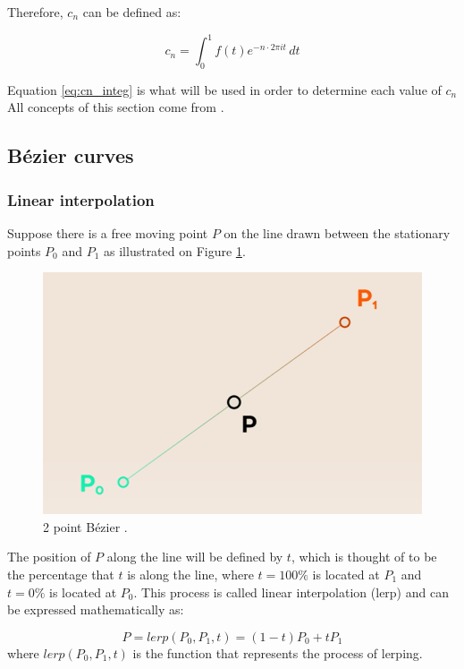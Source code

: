 \documentclass[letterpaper, 12pt]{article}
\begin{document}
Therefore, \(c_n\) can be defined as:

\begin{equation}
    c_n = \int_{0}^{1} f(t) e^{-n \cdot 2\pi it} \,dt
    \label{eq:cn_integ}
\end{equation}

Equation \ref*{eq:cn_integ} is what will be used in order to
determine each value of \(c_n\)
\\

All concepts of this section come from \cite{sandersonWhatFourierSeries2019}.


\subsection{Bézier curves}

\subsubsection{Linear interpolation}

Suppose there is a free moving point \(P\) on the line drawn between
the stationary points \(P_0\) and \(P_1\) as illustrated on
Figure \ref*{fig:2_point_bezier}.

\begin{figure}[H]
    \centering
    \includegraphics[width=.6\textwidth]{2_point_bezier.png}
    \caption{2 point Bézier \protect\cite{holmerBeautyBezierCurves2021}.}
    \label{fig:2_point_bezier}
\end{figure}

The position of \(P\) along the line will be defined by \(t\), which
is thought of to be the percentage that \(t\) is along the line,
where \(t = 100\%\) is located at \(P_1\) and \(t = 0\%\) is located
at \(P_0\). This process is called linear interpolation (lerp) and
can be expressed mathematically as:

\begin{equation}
    P = lerp(P_0, P_1, t) = (1-t)P_0 + tP_1
    \label{eq:lerp_def}
\end{equation}
where \(lerp(P_0, P_1, t)\) is the function that represents the
process of lerping.
\end{document}
